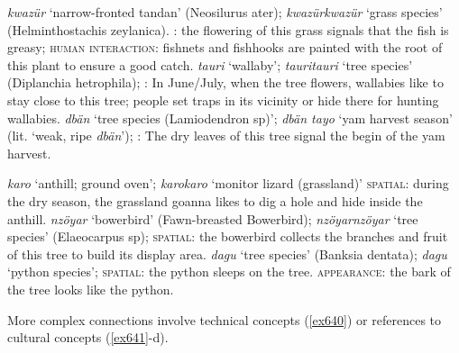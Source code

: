 \begin{exe}
\ex
\label{ex631}
\begin{xlist}
	\ex \label{ex632} \emph{kwazür} `narrow-fronted tandan' (Neosilurus ater); \emph{kwazürkwazür} `grass species' (Helminthostachis zeylanica). \textsc{:} the flowering of this grass signals that the fish is greasy; \textsc{human interaction:} fishnets and fishhooks are painted with the root of this plant to ensure a good catch.
	\ex \label{ex633} \emph{tauri} `wallaby'; \emph{tauritauri} `tree species' (Diplanchia hetrophila); \textsc{:} In June/July, when the tree flowers, wallabies like to stay close to this tree; people set traps in its vicinity or hide there for hunting wallabies.
	\ex \label{ex634} \emph{dbän} `tree species (Lamiodendron sp)'; \emph{dbän tayo} `yam harvest season' (lit. `weak, ripe \emph{dbän}'); \textsc{:} The dry leaves of this tree signal the begin of the yam harvest.
\end{xlist}
\end{exe}%
\begin{exe}
\ex
\label{ex635}
\begin{xlist}
	\ex \label{ex636} \emph{karo} `anthill; ground oven'; \emph{karokaro} `monitor lizard (grassland)' \textsc{spatial:} during the dry season, the grassland goanna likes to dig a hole and hide inside the anthill.
	\ex \label{ex637} \emph{nzöyar} `bowerbird' (Fawn-breasted Bowerbird); \emph{nzöyarnzöyar} `tree species' (Elaeocarpus sp); \textsc{spatial:} the bowerbird collects the branches and fruit of this tree to build its display area.
	\ex \label{ex638} \emph{dagu} `tree species' (Banksia dentata); \emph{dagu} `python species'; \textsc{spatial:} the python sleeps on the tree. \textsc{appearance:} the bark of the tree looks like the python.
\end{xlist}
\end{exe}%

More complex connections involve technical concepts (\ref{ex640}) or references to cultural concepts (\ref{ex641}-d).

